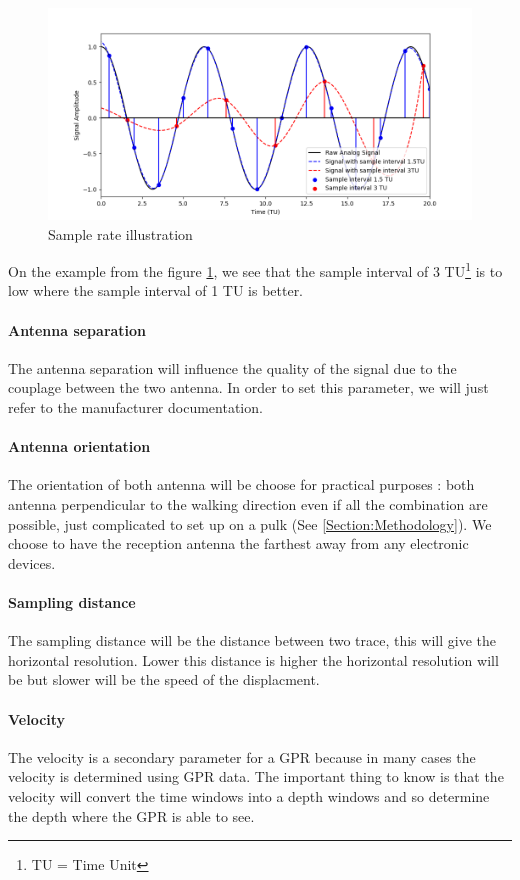 \begin{figure}[H]
    \centering
    \includegraphics[width=0.8\linewidth]{Images/00_Theory/SampleRate.png}
    \caption{Sample rate illustration}
    \label{fig:SampleRate}
\end{figure}

On the example from the figure \ref{fig:SampleRate}, we see that the sample interval of 3 TU\footnote{TU = Time Unit} is to low where the sample interval of 1 TU is better.

\paragraph{Antenna separation} The antenna separation will influence the quality of the signal due to the couplage between the two antenna. In order to set this parameter, we will just refer to the manufacturer documentation.

\paragraph{Antenna orientation} The orientation of both antenna will be choose for practical purposes : both antenna perpendicular to the walking direction even if all the combination are possible, just complicated to set up on a pulk (See \ref{Section:Methodology}). We choose to have the reception antenna the farthest away from any electronic devices.


\paragraph{Sampling distance} The sampling distance will be the distance between two trace, this will give the horizontal resolution. Lower this distance is higher the horizontal resolution will be but slower will be the speed of the displacment.

\paragraph{Velocity} The velocity is a secondary parameter for a GPR because in many cases the velocity is determined using GPR data. The important thing to know is that the velocity will convert the time windows into a depth windows and so determine the depth where the GPR is able to see.


